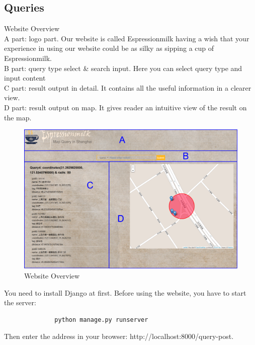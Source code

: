 \documentclass[final,1p,times]{elsarticle}
\begin{document}
\subsection{Queries}
Website Overview\\

A part: logo part. Our website is called Espressionmilk having a wish that your experience in using our website could be as silky as sipping a cup of Espressionmilk.\\

B part: query type select \& search input. Here you can select query type and input content\\

C part: result output in detail. It contains all the useful information in a clearer view.\\

D part: result output on map. It gives reader an intuitive view of the result on the map.

\begin{figure}[thpb]
      \centering
      \includegraphics[width=14cm]{weboverivew.png}
      \caption{Website Overview}
      \label{fig:WO}
\end{figure}

You need to install Django at first. Before using the website, you have to start the server:
\begin{verbatim}
              python manage.py runserver
\end{verbatim}

Then enter the address in your browser: http://localhost:8000/query-post.
\end{document}
